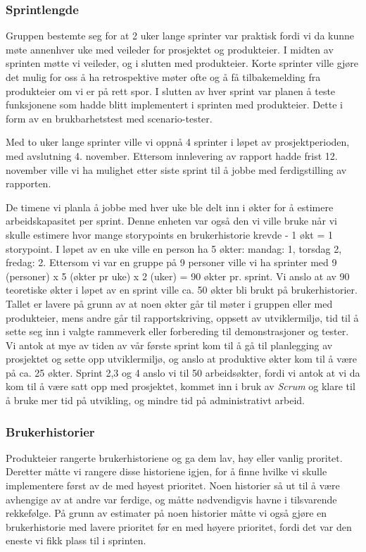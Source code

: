 \documentclass[12pt,a4paper,norsk]{article}
\begin{document}
	\subsubsection{Sprintlengde}
	Gruppen bestemte seg for at 2 uker lange sprinter var praktisk fordi vi da kunne møte annenhver uke med veileder for prosjektet og produkteier. I midten av sprinten møtte vi veileder, og i slutten med produkteier. Korte sprinter ville gjøre det mulig for oss å ha retrospektive møter ofte og å få tilbakemelding fra produkteier om vi er på rett spor. I slutten av hver sprint var planen å teste funksjonene som hadde blitt implementert i sprinten med produkteier. Dette i form av en brukbarhetstest med scenario-tester.

    Med to uker lange sprinter ville vi oppnå 4 sprinter i løpet av prosjektperioden, med avslutning 4. november. Ettersom innlevering av rapport hadde frist 12. november ville vi ha mulighet etter siste sprint til å jobbe med ferdigstilling av rapporten. 
    
    De timene vi planla å jobbe med hver uke ble delt inn i økter for å estimere arbeidskapasitet per sprint. Denne enheten var også den vi ville bruke når vi skulle estimere hvor mange storypoints en brukerhistorie krevde - 1 økt = 1 storypoint. I løpet av en uke ville en person ha 5 økter: mandag: 1, torsdag 2, fredag: 2. Ettersom vi var en gruppe på 9 personer ville vi ha sprinter med 9 (personer) x 5 (økter pr uke) x 2 (uker) = 90 økter pr. sprint. Vi anslo at av 90 teoretiske økter i løpet av en sprint ville ca. 50 økter bli brukt på brukerhistorier. Tallet er lavere på grunn av at noen økter går til møter i gruppen eller med produkteier, mens andre går til rapportskriving, oppsett av utviklermiljø, tid til å sette seg inn i valgte rammeverk eller forbereding til demonstrasjoner og tester. Vi antok at mye av tiden av vår første sprint kom til å gå til planlegging av prosjektet og sette opp utviklermiljø, og anslo at produktive økter kom til å være på ca. 25 økter. Sprint 2,3 og 4 anslo vi til 50 arbeidsøkter, fordi vi antok at vi da kom til å være satt opp med prosjektet, kommet inn i bruk av \textit{Scrum} og klare til å bruke mer tid på utvikling, og mindre tid på administrativt arbeid.

	\subsubsection{Brukerhistorier}
	Produkteier rangerte brukerhistoriene og ga dem lav, høy eller vanlig proritet. Deretter måtte vi rangere disse historiene igjen, for å finne hvilke vi skulle implementere først av de med høyest prioritet. Noen historier så ut til å være avhengige av at andre var ferdige, og måtte nødvendigvis havne i tilsvarende rekkefølge. På grunn av estimater på noen historier måtte vi også gjøre en brukerhistorie med lavere prioritet før en med høyere prioritet, fordi det var den eneste vi fikk plass til i sprinten. 
\end{document}
